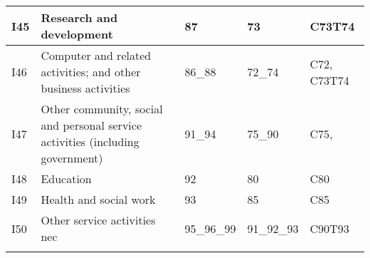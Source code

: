 \documentclass[12pt,english]{article}
\newcommand\lies[2][]{\todo[color=orange!50,#1]{ldf: #2}}
\begin{document}
\begin{table}[ht]
\begin{adjustbox}{width=\textwidth}
\begin{tabular}{lp{500pt}lll}
		I45 & Research and development  & 87 & 73 & C73T74 \\ \midrule
		I46 & Computer and related activities; and other business activities & 86\_88 & 72\_74 & C72, C73T74 \\ \midrule
		I47 & Other community, social and personal service activities (including government) & 91\_94 & 75\_90 & C75,  \\ \midrule
		I48 & Education & 92 & 80 & C80 \\ \midrule
		I49 & Health and social work & 93 & 85 & C85 \\ \midrule
		I50 & Other service activities nec & 95\_96\_99 & 91\_92\_93 & C90T93 \\
		\arrayrulecolor{black}\bottomrule	
	\end{tabular}
	\thispagestyle{empty}
	\end{adjustbox}
\end{table}

\clearpage
%
%
%
\end{document}
